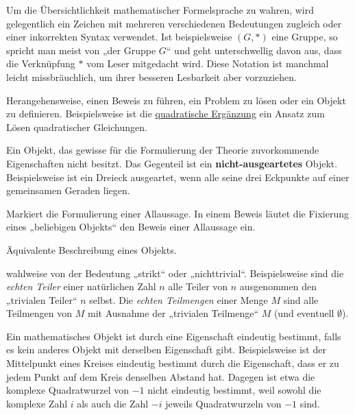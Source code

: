 \begin{description}[labelindent=0pt, leftmargin=0pt]

    \item[abuse of notation:] Um die Übersichtlichkeit mathematischer Formelsprache zu wahren, wird gelegentlich ein Zeichen mit mehreren verschiedenen Bedeutungen zugleich oder einer inkorrekten Syntax verwendet. Ist beispielsweise $(G,*)$ eine Gruppe, so spricht man meist von „der Gruppe $G$“ und geht unterschwellig davon aus, dass die Verknüpfung $*$ vom Leser mitgedacht wird. Diese Notation ist manchmal leicht missbräuchlich, um ihrer besseren Lesbarkeit aber vorzuziehen.

    \item[Ansatz:] Herangehensweise, einen Beweis zu führen, ein Problem zu lösen oder ein Objekt zu definieren. Beispielsweise ist die \href{https://en.wikipedia.org/wiki/Completing_the_square}{quadratische Ergänzung} ein Ansatz zum Lösen quadratischer Gleichungen. 
    
    \item[Ausgeartet:] Ein Objekt, das gewisse für die Formulierung der Theorie zuvorkommende Eigenschaften nicht besitzt. Das Gegenteil ist ein \textbf{nicht-ausgeartetes} Objekt. Beispielsweise ist ein Dreieck ausgeartet, wenn alle seine drei Eckpunkte auf einer gemeinsamen Geraden liegen.

    \item[Beliebig:] Markiert die Formulierung einer Allaussage. In einem Beweis läutet die Fixierung eines „beliebigen Objekts“ den Beweis einer Allaussage ein.

    \item[Charakterisierung:] Äquivalente Beschreibung eines Objekts.

    \item[Echt:] wahlweise von der Bedeutung „strikt“ oder „nichttrivial“. Beispielsweise sind die \emph{echten Teiler} einer natürlichen Zahl $n$ alle Teiler von $n$ ausgenommen den „trivialen Teiler“ $n$ selbst. Die \emph{echten Teilmengen} einer Menge $M$ sind alle Teilmengen von $M$ mit Ausnahme der „trivialen Teilmenge“ $M$ (und eventuell $\emptyset$).

    \item[Eindeutig bestimmt:] Ein mathematisches Objekt ist durch eine Eigenschaft eindeutig bestimmt, falls es kein anderes Objekt mit derselben Eigenschaft gibt. Beispielsweise ist der Mittelpunkt eines Kreises eindeutig bestimmt durch die Eigenschaft, dass er zu jedem Punkt auf dem Kreis denselben Abstand hat. Dagegen ist etwa die komplexe Quadratwurzel von $-1$ nicht eindeutig bestimmt, weil sowohl die komplexe Zahl $i$ als auch die Zahl $-i$ jeweils Quadratwurzeln von $-1$ sind.
    

\end{description}
